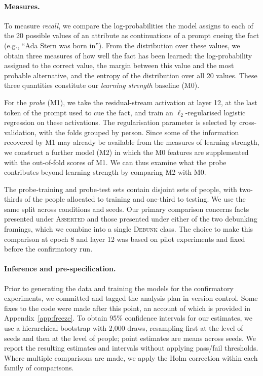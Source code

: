 \documentclass[10pt]{article}
\begin{document}
\paragraph{Measures.}
To measure \emph{recall}, we compare the log-probabilities the model assigns to each of the 20 possible values of an attribute as continuations of a prompt cueing the fact (e.g., ``Ada Stern was born in''). From the distribution over these values, we obtain three measures of how well the fact has been learned: the log-probability assigned to the correct value, the margin between this value and the most probable alternative, and the entropy of the distribution over all 20 values. These three quantities constitute our \emph{learning strength} baseline (M0).

For the \emph{probe} (M1), we take the residual-stream activation at layer 12, at the last token of the prompt used to cue the fact, and train an $\ell_2$-regularised logistic regression on these activations. The regularisation parameter is selected by cross-validation, with the folds grouped by person. Since some of the information recovered by M1 may already be available from the measures of learning strength, we construct a further model (M2) in which the M0 features are supplemented with the out-of-fold scores of M1. We can thus examine what the probe contributes beyond learning strength by comparing M2 with M0.

The probe-training and probe-test sets contain disjoint sets of people, with two-thirds of the people allocated to training and one-third to testing. We use the same split across conditions and seeds. Our primary comparison concerns facts presented under \textsc{Asserted} and those presented under either of the two debunking framings, which we combine into a single \textsc{Debunk} class. The choice to make this comparison at epoch 8 and layer 12 was based on pilot experiments and fixed before the confirmatory run.

\paragraph{Inference and pre-specification.}
Prior to generating the data and training the models for the confirmatory experiments, we committed and tagged the analysis plan in version control. Some fixes to the code were made after this point, an account of which is provided in Appendix~\ref{app:freeze}. To obtain 95\% confidence intervals for our estimates, we use a hierarchical bootstrap with 2{,}000 draws, resampling first at the level of seeds and then at the level of people; point estimates are means across seeds. We report the resulting estimates and intervals without applying pass/fail thresholds. Where multiple comparisons are made, we apply the Holm correction within each family of comparisons.
\end{document}
